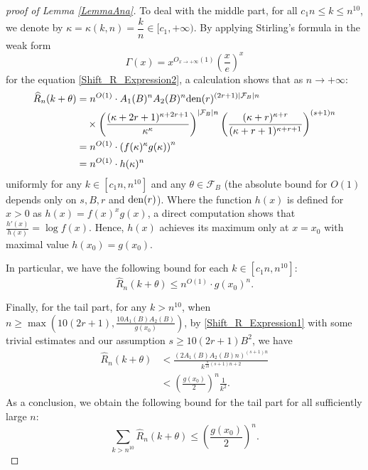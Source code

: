 \documentclass[11pt]{amsart}
\numberwithin{equation}{section}
\begin{document}
\begin{proof}[proof of Lemma \ref{LemmaAna}]
To deal with the middle part, for all $c_1 n \leqslant k \leqslant n^{10}$, we denote by $\kappa = \kappa(k,n) = \dfrac{k}{n} \in [c_1, +\infty)$. By applying Stirling's formula in the weak form
\[ \Gamma(x) = x^{O_{x \rightarrow +\infty}(1)}\left( \frac{x}{e} \right)^x \]
for the equation \eqref{Shift_R_Expression2}, a calculation shows that as $n \rightarrow +\infty$:
\begin{align}
\widehat{R}_{n}(k+\theta) &= n^{O(1)} \cdot A_1(B)^n A_2(B)^n {\rm den}(r)^{(2r+1)|\mathcal{F}_B|n}  \nonumber \\
&\quad \times \left( \frac{(\kappa + 2r + 1)^{\kappa + 2r + 1}}{\kappa^\kappa} \right)^{|\mathcal{F}_B|n} \left( \frac{(\kappa + r)^{\kappa + r}}{(\kappa + r + 1)^{\kappa + r + 1}} \right)^{(s+1)n}  \nonumber \\
&=   n^{O(1)} \cdot \left(  f(\kappa)^{\kappa} g(\kappa)  \right)^n \nonumber \\
&= n^{O(1)} \cdot h(\kappa)^n  \label{secondpartoriginal}
\end{align}
uniformly for any $k \in[c_1n,n^{10}]$ and any $\theta \in \mathcal{F}_B$ (the absolute bound for $O(1)$ depends only on $s,B,r$ and ${\rm den}(r)$). Where the function $h(x)$ is defined for $x>0$ as $h(x)= f(x)^x g(x)$, a direct computation shows that $\frac{h'(x)}{h(x)} = \log f(x)$. Hence, $h(x)$ achieves its maximum only at $x = x_0$ with maximal value $h(x_0) = g(x_0)$.

In particular, we have the following bound for each $k \in  [c_1 n , n^{10}]$:
\begin{equation}\label{secondpart}
\widehat{R}_{n}(k+\theta) \leqslant  n^{O(1)} \cdot g(x_0)^n.
\end{equation}

Finally, for the tail part, for any $k > n^{10}$, when $n \geq \max(10(2r+1), \frac{10A_1(B)A_2(B)}{g(x_0)})$, by \eqref{Shift_R_Expression1} with some trivial estimates and our assumption $s \geq 10(2r+1)B^2$, we have
\begin{align*}
\widehat{R}_{n}(k+\theta) &<   \frac{(2A_1(B)A_2(B)n)^{(s+1)n}}{k^{\frac{9}{10}(s+1)n + 2}} \\
&< \left( \frac{g(x_0)}{2} \right)^n \frac{1}{k^2}.
\end{align*}
As a conclusion, we obtain the following bound for the tail part for all sufficiently large $n$:
\begin{equation}\label{thirdpart}
\sum_{k> n^{10}}  \widehat{R}_{n}(k+\theta) \leqslant \left( \frac{g(x_0)}{2} \right)^n.
\end{equation}


\end{proof}
\end{document}
